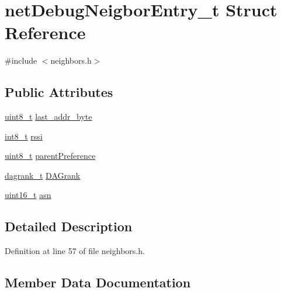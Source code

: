 \hypertarget{structnet_debug_neigbor_entry__t}{}\section{net\+Debug\+Neigbor\+Entry\+\_\+t Struct Reference}
\label{structnet_debug_neigbor_entry__t}


{\ttfamily \#include $<$neighbors.\+h$>$}

\subsection*{Public Attributes}
\begin{DoxyCompactItemize}
\item 
\hyperlink{_p_e___types_8h_aba7bc1797add20fe3efdf37ced1182c5}{uint8\+\_\+t} \hyperlink{structnet_debug_neigbor_entry__t_a40f416cf939cf5afff5a93f33f59a5c5}{last\+\_\+addr\+\_\+byte}
\item 
\hyperlink{_p_e___types_8h_aef44329758059c91c76d334e8fc09700}{int8\+\_\+t} \hyperlink{structnet_debug_neigbor_entry__t_a60fc35dde6926b216d6458b59416aa40}{rssi}
\item 
\hyperlink{_p_e___types_8h_aba7bc1797add20fe3efdf37ced1182c5}{uint8\+\_\+t} \hyperlink{structnet_debug_neigbor_entry__t_a091ad78edf8df0476cbf0cd40628b1b1}{parent\+Preference}
\item 
\hyperlink{opendefs_8h_a502861d0bb432f5702761bd854023e21}{dagrank\+\_\+t} \hyperlink{structnet_debug_neigbor_entry__t_a598ec07b40276860d689e9c792422881}{D\+A\+Grank}
\item 
\hyperlink{_p_e___types_8h_a1f1825b69244eb3ad2c7165ddc99c956}{uint16\+\_\+t} \hyperlink{structnet_debug_neigbor_entry__t_a165b554d93490830877a8866318aea04}{asn}
\end{DoxyCompactItemize}


\subsection{Detailed Description}


Definition at line 57 of file neighbors.\+h.



\subsection{Member Data Documentation}
